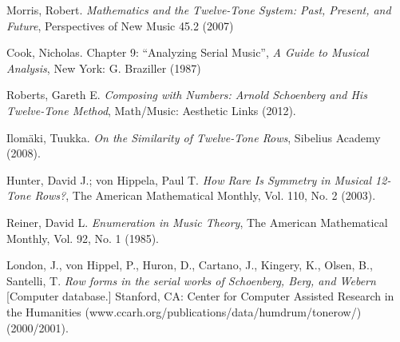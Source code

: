 \begin{thebibliography}{00}
			{\sc Morris, Robert.}
			\textit{Mathematics and the Twelve-Tone System: Past, Present, and Future},
			Perspectives of New Music 45.2 
			(2007)
			
			{\sc Cook, Nicholas.} Chapter 9: “Analyzing Serial Music”,
			\textit{A Guide to Musical Analysis},
			New York: G. Braziller
			(1987)
			
			{\sc Roberts, Gareth E.}
			\textit{Composing with Numbers: Arnold Schoenberg and His Twelve-Tone Method},
			Math/Music: Aesthetic Links
			(2012).
			
			{\sc Ilom\"aki, Tuukka.}
			\textit{On the Similarity of Twelve-Tone Rows},
			Sibelius Academy
			(2008).
	
			{\sc Hunter, David J.; von Hippela, Paul T.}
			\textit{How Rare Is Symmetry in Musical 12-Tone Rows?},
			The American Mathematical Monthly, Vol. 110, No. 2
			(2003).
			
			{\sc Reiner, David L.}
			\textit{Enumeration in Music Theory},
			The American Mathematical Monthly, Vol. 92, No. 1
			(1985).
			
			{\sc London, J., von Hippel, P., Huron, D., Cartano, J., Kingery, K., Olsen, B., Santelli, T.}
			\textit{Row forms in the serial works of Schoenberg, Berg, and Webern}
			[Computer database.] Stanford, CA: Center for Computer Assisted Research in the Humanities (www.ccarh.org/publications/data/humdrum/tonerow/) (2000/2001).
						
	\end{thebibliography}